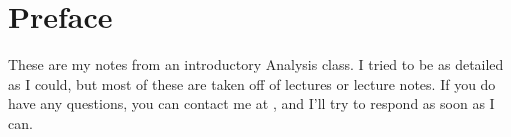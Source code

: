 \chapter{Preface}
These are my notes from an introductory Analysis class. I tried to be as detailed as I could, but most of these are taken off of lectures or lecture notes. If you do have any questions, you can contact me at , and I'll try to respond as soon as I can. 
